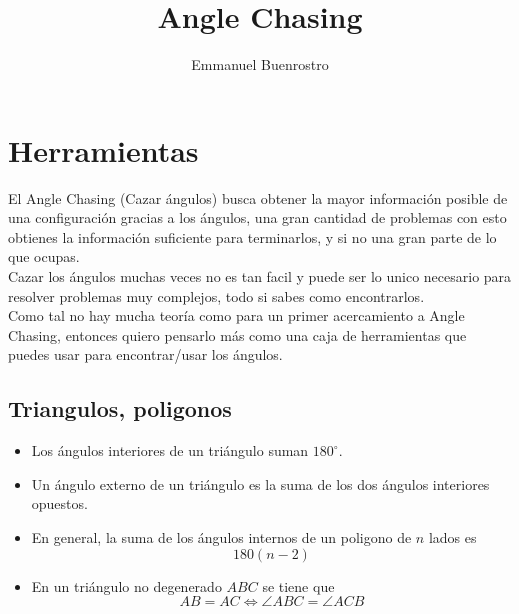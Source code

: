 \documentclass[11pt]{scrartcl}
\title {Angle Chasing}
\author{Emmanuel Buenrostro}
\begin{document}
\maketitle
\section{Herramientas}
El Angle Chasing (Cazar \'angulos) busca obtener la mayor informaci\'on posible de una configuraci\'on gracias a los \'angulos, una gran cantidad de problemas con esto obtienes la informaci\'on suficiente para terminarlos, y si no una gran parte de lo que ocupas. \\
Cazar los \'angulos muchas veces no es tan facil y puede ser lo unico necesario para resolver problemas muy complejos, todo si sabes como encontrarlos.
\\
Como tal no hay mucha teor\'ia como para un primer acercamiento a Angle Chasing, entonces quiero pensarlo m\'as como una caja de herramientas que puedes usar para encontrar/usar los \'angulos. 
\subsection{Triangulos, poligonos}

\begin{itemize}
\item    Los \'angulos interiores de un tri\'angulo suman $180^{\circ}$.


\item    Un \'angulo externo de un tri\'angulo es la suma de los dos \'angulos interiores opuestos.

\item    En general, la suma de los \'angulos internos de un poligono de $n$ lados es 
    $$180(n-2)$$

\item    En un tri\'angulo no degenerado $ABC$ se tiene que 
    $$AB=AC \Longleftrightarrow \angle ABC = \angle ACB$$

\end{itemize}
\end{document}
